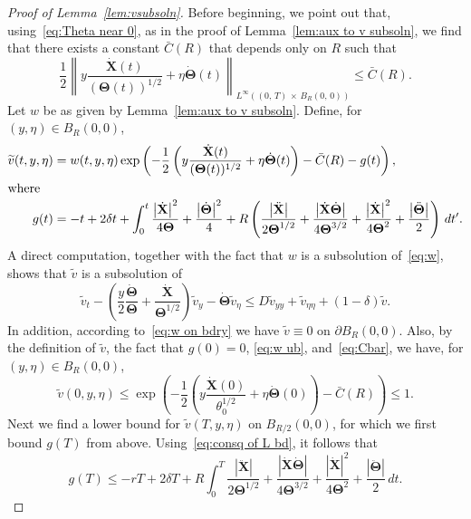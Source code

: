 \documentclass[AHL,Unicode,longabstracts]{cedram}
\newcommand{\bX}{\mathbf{X}}
\newcommand{\bTheta}{\boldsymbol{\Theta}}
\newcommand{\1}{\mathds{1}}
\begin{document}
\begin{proof}[Proof of Lemma~\ref{lem:vsubsoln}]
Before beginning, we point out that, using~\eqref{eq:Theta near 0}, as in the proof of Lemma~\ref{lem:aux to v subsoln}, we find that there exists a constant $\bar{C}(R)$ that depends only on $R$ such that
\begin{equation}\label{eq:Cbar}
\frac{1}{2}\left\| y \frac{\dot{\bX}(t)}{(\bTheta(t))^{1/2}} +\eta \dot{\bTheta}(t) \right\|_{L^\infty\left((0,\,T)\,\times\,B_R(0,\,0)\right)}\leq \bar C(R).
\end{equation}
Let $w$ be as given by Lemma~\ref{lem:aux to v subsoln}. Define, for $(y,\eta) \in B_R(0,0)$,
\begin{align*}
\widetilde{v}(t,y,\eta) &= w(t,y,\eta)\exp\left (-\frac{1}{2}\left(y \frac{\dot{\bX}(t)}{(\bTheta(t))^{1/2}} +\eta \dot{\bTheta}(t)\right) - \bar{C}(R) -g(t)\right),\\
\intertext{where}
g(t) &=-t+2\delta t+ \int_0^t \frac{\left|\dot{\bX}\right|^2}{4\bTheta} +\frac{\left|\dot{\bTheta}\right|^2}{4} + R\left(\frac{\left|\ddot{\bX}\right|}{2\bTheta^{1/2}}+ \frac{\left|\dot{\bX}\dot{\bTheta}\right|}{4\bTheta^{3/2}} +\frac{\left|\dot{\bX}\right|^2}{4\bTheta^2}+\frac{\left|\ddot{\bTheta}\right|}{2}\right)\, dt'.
\end{align*}
A direct computation, together with the fact that $w$ is a subsolution of~\eqref{eq:w}, shows that $\widetilde{v}$ is a subsolution of
\[
\widetilde{v}_t - \left(\frac{y}{2}\frac{\dot{\bTheta}}{\bTheta} + \frac{\dot{\bX}}{\bTheta^{1/2}}\right) \widetilde{v}_y - \dot{\bTheta} \widetilde{v}_\eta \leq D \widetilde{v}_{yy} + \widetilde{v}_{\eta\eta} + (1-\delta)\widetilde{v}.
\]
In addition, according to~\eqref{eq:w on bdry} we have $\widetilde{v}\equiv 0$ on $\partial B_R(0,0)$. Also, by the definition of $\widetilde{v}$, the fact that $g(0) = 0$, \eqref{eq:w ub}, and~\eqref{eq:Cbar}, we have, for $(y,\eta)\in B_R(0,0)$,
\[
\widetilde{v}(0,y,\eta)\leq \exp\left (-\frac{1}{2}\left(y \frac{\dot{\bX}(0)}{\theta_0^{1/2}} +\eta \dot{\bTheta}(0)\right) - \bar{C}(R) \right)\leq 1.
\]
Next we find a lower bound for $\widetilde{v}(T, y, \eta)$ on $ B_{R/2}(0,0)$, for which we first bound $g(T)$ from above. Using~\eqref{eq:consq of L bd}, it follows that
\begin{equation*}
g(T)\leq -r T+2\delta T + R\int_0^T \frac{\left|\ddot{\bX}\right|}{2\bTheta^{1/2}}+ \frac{\left|\dot{\bX}\dot{\bTheta}\right|}{4\bTheta^{3/2}} +\frac{\left|\dot{\bX}\right|^2}{4\bTheta^2}+\frac{\left|\ddot{\bTheta}\right|}{2}\, dt.
\end{equation*}

\end{proof}
\end{document}
